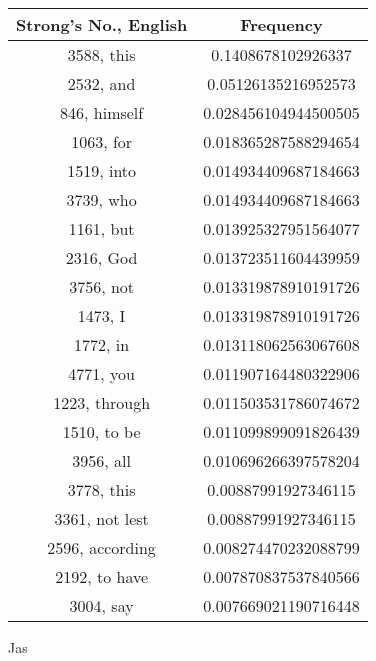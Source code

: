 \documentclass[12pt,letterpaper]{article}
\begin{document}
 \begin{longtable}{|c|c|}
\hline
 Strong's No., English & Frequency \\ \hline  
3588, this & 0.1408678102926337\\ \hline 
 2532, and & 0.05126135216952573\\ \hline 
 846, himself & 0.028456104944500505\\ \hline 
 1063, for & 0.018365287588294654\\ \hline 
 1519, into & 0.014934409687184663\\ \hline 
 3739, who & 0.014934409687184663\\ \hline 
 1161, but & 0.013925327951564077\\ \hline 
 2316, God & 0.013723511604439959\\ \hline 
 3756, not & 0.013319878910191726\\ \hline 
 1473, I & 0.013319878910191726\\ \hline 
 1772, in & 0.013118062563067608\\ \hline 
 4771, you & 0.011907164480322906\\ \hline 
 1223, through & 0.011503531786074672\\ \hline 
 1510, to be & 0.011099899091826439\\ \hline 
 3956, all & 0.010696266397578204\\ \hline 
 3778, this & 0.00887991927346115\\ \hline 
 3361, not lest & 0.00887991927346115\\ \hline 
 2596, according & 0.008274470232088799\\ \hline 
 2192, to have & 0.007870837537840566\\ \hline 
 3004, say & 0.007669021190716448\\ \hline 
\end{longtable} 
 

Jas
\end{document}

